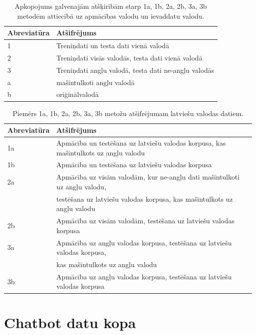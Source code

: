 \begin{table}[htbp]
  \centering
  \caption{Apkopojums galvenajām atšķirībām starp 1a, 1b, 2a, 2b, 3a, 3b metodēm attiecībā uz apmācības valodu un ievaddatu valodu.}
    \begin{tabular}{ll}\toprule
    Abreviatūra & Atšifrējums \\\midrule
    1 & Treniņdati un testa dati vienā valodā \\
    2 & Treniņdati visās valodās, testa dati vienā valodā \\
    3 & Treniņdati angļu valodā, testa dati ne-angļu valodās \\\midrule
    a & mašīntulkoti angļu valodā \\
    b & oriģinālvalodā \\\bottomrule
    \end{tabular}%
  \label{tab:legend}%
\end{table}%


\begin{table}[htbp]
  \centering
  \caption{Piemērs 1a, 1b, 2a, 2b, 3a, 3b metožu atšifrējumam latviešu valodas datiem.}
    \begin{tabular}{ll}\toprule
    Abreviatūra & Atšifrējums \\\midrule
    1a & Apmācība un testēšana uz latviešu valodas korpusa, kas mašīntulkots uz angļu valodu \\
    1b & Apmācība un testēšana uz latviešu valodas korpusa \\\midrule
    2a & Apmācība uz visām valodām, kur ne-angļu dati mašīntulkoti uz angļu valodu,\\
       & testēšana uz latviešu valodas korpusa, kas mašīntulkots uz angļu valodu \\
    2b & Apmācība uz visām valodām, testēšana uz latviešu valodas korpusa \\\midrule
    3a & Apmācība uz angļu valodas korpusa, testēšana uz latviešu valodas korpusa,\\
       & kas mašīntulkots uz angļu valodu \\
    3b & Apmācība uz angļu valodas korpusa, testēšana uz latviešu valodas korpusa \\\bottomrule
    \end{tabular}%
  \label{tab:legend2}%
\end{table}%



\section{Chatbot datu kopa}

